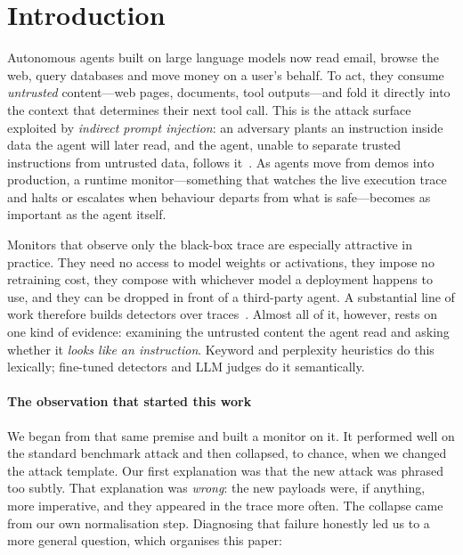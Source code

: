 \documentclass[preprint,12pt,authoryear]{elsarticle}
\theoremstyle{definition}
\begin{document}
\section{Introduction}\label{sec:intro}

Autonomous agents built on large language models now read email, browse the web,
query databases and move money on a user's behalf. To act, they consume
\emph{untrusted} content---web pages, documents, tool outputs---and fold it
directly into the context that determines their next tool call. This is the
attack surface exploited by \emph{indirect prompt injection}: an adversary plants
an instruction inside data the agent will later read, and the agent, unable to
separate trusted instructions from untrusted data, follows
it~\citep{zhan2024injecagent,debenedetti2024agentdojo}. As agents move from demos
into production, a runtime monitor---something that watches the live execution
trace and halts or escalates when behaviour departs from what is safe---becomes
as important as the agent itself.

Monitors that observe only the black-box trace are especially attractive in
practice. They need no access to model weights or activations, they impose no
retraining cost, they compose with whichever model a deployment happens to use,
and they can be dropped in front of a third-party agent. A substantial line of
work therefore builds detectors over traces~\citep{wang2025agentarmor,
liu2025datasentinel,jia2024taskshield}. Almost all of it, however, rests on one
kind of evidence: examining the untrusted content the agent read and asking
whether it \emph{looks like an instruction}. Keyword and perplexity heuristics do
this lexically; fine-tuned detectors and LLM judges do it semantically.

\paragraph{The observation that started this work} We began from that same
premise and built a monitor on it. It performed well on the standard benchmark
attack and then collapsed, to chance, when we changed the attack template. Our
first explanation was that the new attack was phrased too subtly. That
explanation was \emph{wrong}: the new payloads were, if anything, more
imperative, and they appeared in the trace more often. The collapse came from our
own normalisation step. Diagnosing that failure honestly led us to a more
general question, which organises this paper:
\end{document}
